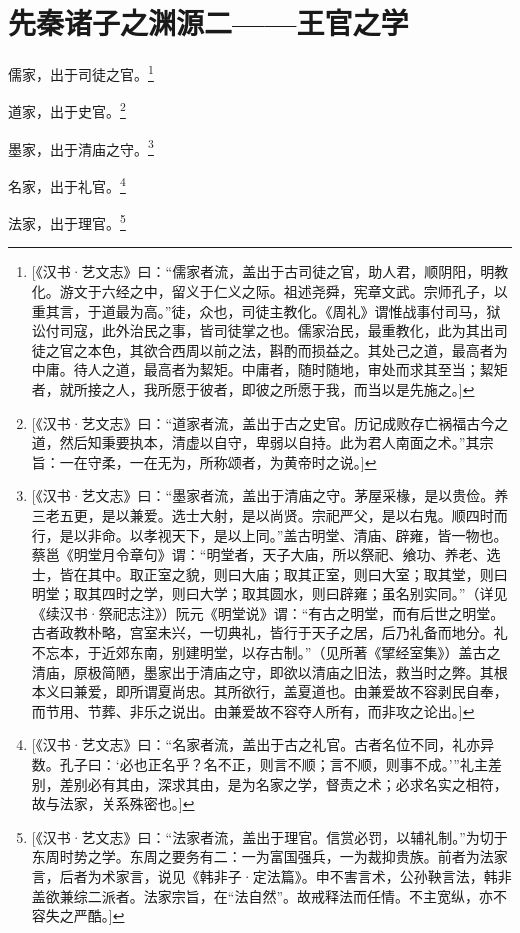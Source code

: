 \chapter{先秦诸子之渊源二——王官之学}

儒家，出于司徒之官。\footnote{[《汉书·艺文志》曰：“儒家者流，盖出于古司徒之官，助人君，顺阴阳，明教化。游文于六经之中，留义于仁义之际。祖述尧舜，宪章文武。宗师孔子，以重其言，于道最为高。”徒，众也，司徒主教化。《周礼》谓惟战事付司马，狱讼付司寇，此外治民之事，皆司徒掌之也。儒家治民，最重教化，此为其出司徒之官之本色，其欲合西周以前之法，斟酌而损益之。其处己之道，最高者为中庸。待人之道，最高者为絜矩。中庸者，随时随地，审处而求其至当；絜矩者，就所接之人，我所愿于彼者，即彼之所愿于我，而当以是先施之。]}

道家，出于史官。\footnote{[《汉书·艺文志》曰：“道家者流，盖出于古之史官。历记成败存亡祸福古今之道，然后知秉要执本，清虚以自守，卑弱以自持。此为君人南面之术。”其宗旨：一在守柔，一在无为，所称颂者，为黄帝时之说。]}

墨家，出于清庙之守。\footnote{[《汉书·艺文志》曰：“墨家者流，盖出于清庙之守。茅屋采椽，是以贵俭。养三老五更，是以兼爱。选士大射，是以尚贤。宗祀严父，是以右鬼。顺四时而行，是以非命。以孝视天下，是以上同。”盖古明堂、清庙、辟雍，皆一物也。蔡邕《明堂月令章句》谓：“明堂者，天子大庙，所以祭祀、飨功、养老、选士，皆在其中。取正室之貌，则曰大庙；取其正室，则曰大室；取其堂，则曰明堂；取其四时之学，则曰大学；取其圆水，则曰辟雍；虽名别实同。”（详见《续汉书·祭祀志注》）阮元《明堂说》谓：“有古之明堂，而有后世之明堂。古者政教朴略，宫室未兴，一切典礼，皆行于天子之居，后乃礼备而地分。礼不忘本，于近郊东南，别建明堂，以存古制。”（见所著《揅经室集》）盖古之清庙，原极简陋，墨家出于清庙之守，即欲以清庙之旧法，救当时之弊。其根本义曰兼爱，即所谓夏尚忠。其所欲行，盖夏道也。由兼爱故不容剥民自奉，而节用、节葬、非乐之说出。由兼爱故不容夺人所有，而非攻之论出。]}

名家，出于礼官。\footnote{[《汉书·艺文志》曰：“名家者流，盖出于古之礼官。古者名位不同，礼亦异数。孔子曰：‘必也正名乎？名不正，则言不顺；言不顺，则事不成。’”礼主差别，差别必有其由，深求其由，是为名家之学，督责之术；必求名实之相符，故与法家，关系殊密也。]}

法家，出于理官。\footnote{[《汉书·艺文志》曰：“法家者流，盖出于理官。信赏必罚，以辅礼制。”为切于东周时势之学。东周之要务有二：一为富国强兵，一为裁抑贵族。前者为法家言，后者为术家言，说见《韩非子·定法篇》。申不害言术，公孙鞅言法，韩非盖欲兼综二派者。法家宗旨，在“法自然”。故戒释法而任情。不主宽纵，亦不容失之严酷。]}


